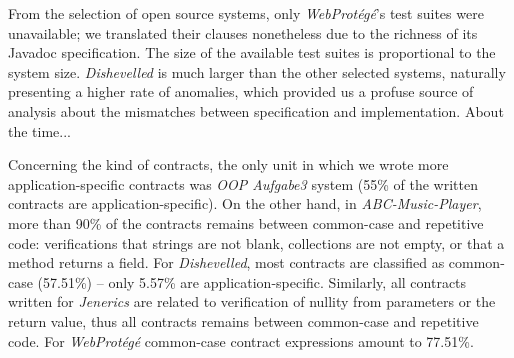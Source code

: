 


From the selection of open source systems, only \emph{WebProtégé}'s test suites were unavailable; we translated their clauses nonetheless due to the richness of its Javadoc specification.
The size of the available test suites is proportional to the system size.
\emph{Dishevelled} is much larger than the other selected systems, naturally presenting a higher rate of anomalies, which provided us a profuse source of analysis about the mismatches between specification and implementation. 
About the time...



Concerning the kind of contracts, the only unit in which we wrote more
application-specific contracts was \emph{OOP Aufgabe3} system (55\% of the
written contracts are application-specific). On the other hand, in \emph{ABC-Music-Player}, more than 90\% of the contracts remains between common-case and repetitive code: verifications that strings are not blank, collections are not empty, or that a method returns a field.
For \emph{Dishevelled}, most contracts are classified as common-case (57.51\%) -- 
only 5.57\% are application-specific.
Similarly, all contracts written for \emph{Jenerics} are related to verification of nullity from parameters or the return value, thus all contracts
remains between common-case and repetitive code.
For \emph{WebProt\'{e}g\'{e}}  common-case contract expressions amount to 77.51\%.  



